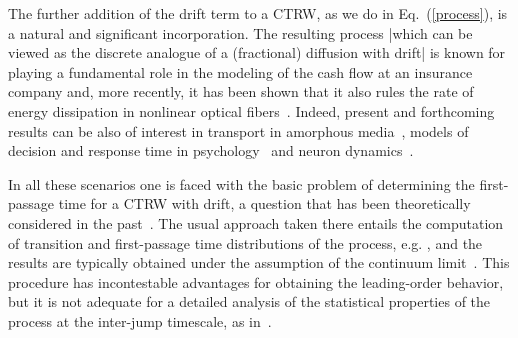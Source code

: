 \documentclass[english,aps,a4paper,twocolumn,showpacs,showkeys,amsfonts,amsmath,amssymb,amscd,nofootinbib]{revtex4}
\newcommand{\1}{\'\i}
\begin{document}
The further addition of the drift term to a CTRW, as we do in Eq.~(\ref{process}), is a natural and significant incorporation. The resulting process |which can be viewed as the discrete  analogue of a (fractional) diffusion with drift| is known for playing  a fundamental   role  in %
the modeling of
the cash flow at an insurance company \cite{j03,zyl10} and, more recently,  it has been shown that it %
also rules the rate of   energy dissipation in  nonlinear optical
fibers~\cite{VM1}. Indeed, present and forthcoming results  can be also of interest in
   transport in amorphous media~\cite{Ba},
models of  decision
  and response time in psychology~\cite{Sm} and neuron dynamics~\cite{Sm2}. 

In all these scenarios one is faced with the basic problem of determining the first-passage time for a CTRW with drift, a question that has been theoretically considered in the past~\cite{m87,m92,c97,cmc97,rd00a,rd00b,MB,is07}. The usual approach taken there entails the computation of transition and first-passage time distributions of the process, e.g. \cite{m92,MB}, and the results are typically obtained under the assumption of the continuum limit~\cite{rd00a,rd00b,MB,is07}. %
This procedure has incontestable advantages for obtaining the leading-order behavior, but it is not adequate for a detailed analysis of the statistical properties of the process at the inter-jump timescale, as in~\cite{mmw03,mpmlmm05,
j03,zyl10,VM1}.
\end{document}
